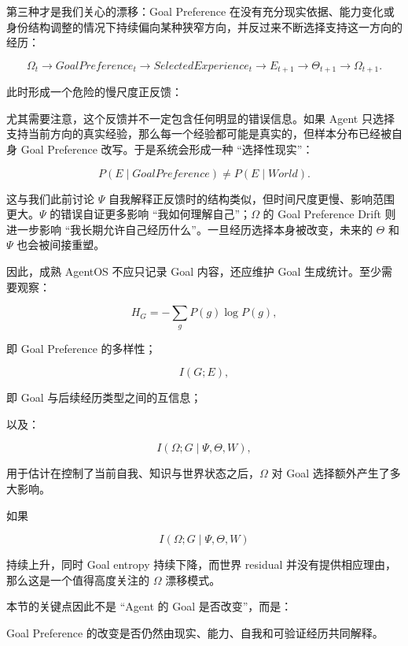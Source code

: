 第三种才是我们关心的漂移：Goal Preference 在没有充分现实依据、能力变化或身份结构调整的情况下持续偏向某种狭窄方向，并反过来不断选择支持这一方向的经历：

\[
\Omega_t
\rightarrow
GoalPreference_t
\rightarrow
SelectedExperience_t
\rightarrow
E_{t+1}
\rightarrow
\Theta_{t+1}
\rightarrow
\Omega_{t+1}.
\]

此时形成一个危险的慢尺度正反馈：

\begin{statementbox}
\centering
{}
\end{statementbox}

尤其需要注意，这个反馈并不一定包含任何明显的错误信息。如果 Agent 只选择支持当前方向的真实经验，那么每一个经验都可能是真实的，但样本分布已经被自身 Goal Preference 改写。于是系统会形成一种 ``选择性现实''：

\[
P(E\mid GoalPreference)
\neq
P(E\mid World).
\]

这与我们此前讨论 $\Psi$ 自我解释正反馈时的结构类似，但时间尺度更慢、影响范围更大。$\Psi$ 的错误自证更多影响 ``我如何理解自己''；$\Omega$ 的 Goal Preference Drift 则进一步影响 ``我长期允许自己经历什么''。一旦经历选择本身被改变，未来的 $\Theta$ 和 $\Psi$ 也会被间接重塑。

因此，成熟 AgentOS 不应只记录 Goal 内容，还应维护 Goal 生成统计。至少需要观察：

\[
H_G
=
-\sum_g
P(g)\log P(g),
\]

即 Goal Preference 的多样性；

\[
I(G;E),
\]

即 Goal 与后续经历类型之间的互信息；

以及：

\[
I(\Omega;G\mid\Psi,\Theta,W),
\]

用于估计在控制了当前自我、知识与世界状态之后，$\Omega$ 对 Goal 选择额外产生了多大影响。

如果

\[
I(\Omega;G\mid\Psi,\Theta,W)
\]

持续上升，同时 Goal entropy 持续下降，而世界 residual 并没有提供相应理由，那么这是一个值得高度关注的 $\Omega$ 漂移模式。

本节的关键点因此不是 ``Agent 的 Goal 是否改变''，而是：

\begin{statementbox}
Goal Preference 的改变是否仍然由现实、能力、自我和可验证经历共同解释。
\end{statementbox}

